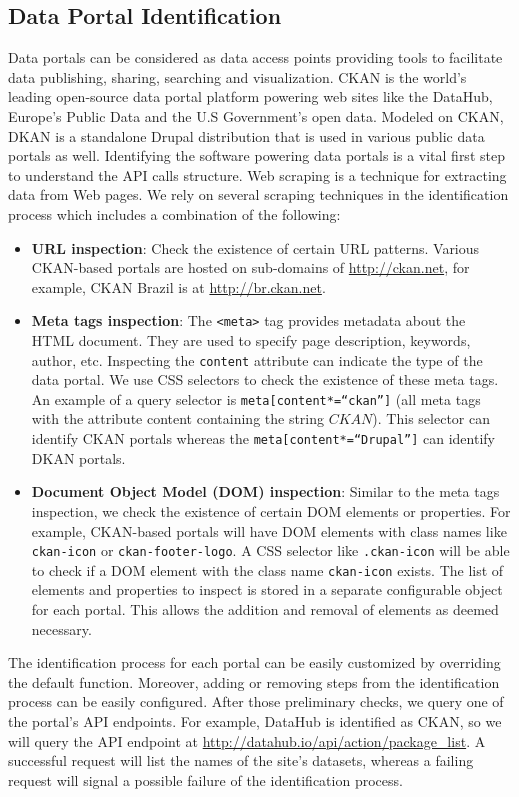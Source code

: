 \documentclass{sig-alternate}
\begin{document}
\subsection{Data Portal Identification}
Data portals can be considered as data access points providing tools to facilitate data publishing, sharing, searching and visualization. CKAN is the world's leading open-source data portal platform powering web sites like the DataHub, Europe's Public Data and the U.S Government's open data. Modeled on CKAN, DKAN is a standalone Drupal distribution that is used in various public data portals as well. Identifying the software powering data portals is a vital first step to understand the API calls structure. Web scraping is a technique for extracting data from Web pages. We rely on several scraping techniques in the identification process which includes a combination of the following:
\begin{itemize}
  \item \textbf{URL inspection}: Check the existence of certain URL patterns. Various CKAN-based portals are hosted on sub-domains of \url{http://ckan.net}, for example, CKAN Brazil is at \url{http://br.ckan.net}.
  \item \textbf{Meta tags inspection}: The \texttt{<meta>} tag provides metadata about the HTML document. They are used to specify page description, keywords, author, etc. Inspecting the \texttt{content} attribute can indicate the type of the data portal. We use CSS selectors to check the existence of these meta tags. An example of a query selector is \texttt{meta[content*=``ckan'']} (all meta tags with the attribute content containing the string $CKAN$). This selector can identify CKAN portals whereas the \texttt{meta[content*=``Drupal'']} can identify DKAN portals.
  \item \textbf{Document Object Model (DOM) inspection}: Similar to the meta tags inspection, we check the existence of certain DOM elements or properties. For example, CKAN-based portals will have DOM elements with class names like \texttt{ckan-icon} or \texttt{ckan-footer-logo}. A CSS selector like \texttt{.ckan-icon} will be able to check if a DOM element with the class name \texttt{ckan-icon} exists. The list of elements and properties to inspect is stored in a separate configurable object for each portal. This allows the addition and removal of elements as deemed necessary.
\end{itemize}

The identification process for each portal can be easily customized by overriding the default function. Moreover, adding or removing steps from the identification process can be easily configured. After those preliminary checks, we query one of the portal's API endpoints. For example, DataHub is identified as CKAN, so we will query the API endpoint at \url{http://datahub.io/api/action/package_list}. A successful request will list the names of the site's datasets, whereas a failing request will signal a possible failure of the identification process.
\end{document}
